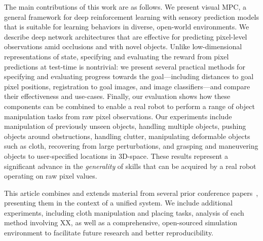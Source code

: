 The main contributions of this work are as follows. We present visual MPC, a general framework for deep reinforcement learning with sensory prediction models that is suitable for learning behaviors in diverse, open-world environments.
We describe deep network architectures that are effective for predicting pixel-level observations amid occlusions and with novel objects. Unlike low-dimensional representations of state, specifying and evaluating the reward from pixel predictions at test-time is nontrivial: we present several practical methods for specifying and evaluating progress towards the goal---including distances to goal pixel positions, registration to goal images, and image classifiers---and compare their effectiveness and use-cases.
Finally, our evaluation shows how these components can be combined to enable a real robot to perform a range of object manipulation tasks from raw pixel observations. Our experiments include manipulation of previously unseen objects, handling multiple objects, pushing objects around obstructions, handling clutter, manipulating deformable objects such as cloth, recovering from large perturbations, and grasping and maneuvering objects to user-specified locations in 3D-space. These results represent a significant advance in the \emph{generality} of skills that can be acquired by a real robot operating on raw pixel values.

This article combines and extends material from several prior conference papers~\cite{foresight,sna,ebert2018robustness,flo}, presenting them in the context of a unified system. We include additional experiments, including cloth manipulation and placing tasks, analysis of each method involving XX, as well as a comprehensive, open-sourced simulation environment to facilitate future research and better reproducibility.




 





